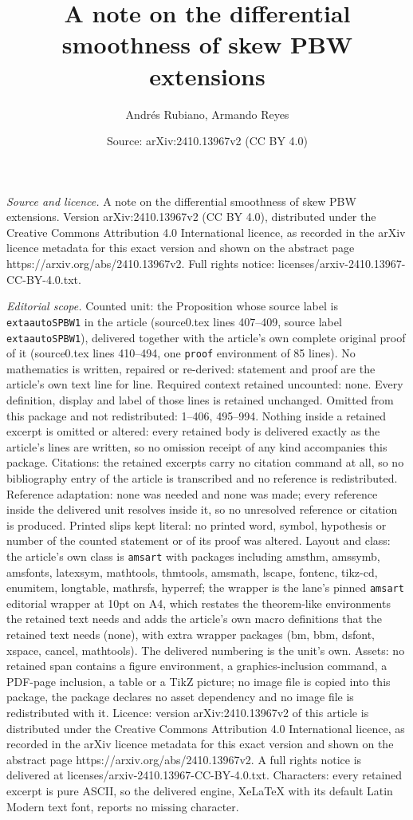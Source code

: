 \documentclass[10pt,a4paper]{amsart}
\title[A note on the differential smoothness of skew PBW extensions]{A note on the differential smoothness of skew PBW extensions}
\author{Andr\'es Rubiano, Armando Reyes}
\date{Source: arXiv:2410.13967v2 (CC BY 4.0)}
\begin{document}
\maketitle

\noindent\emph{Source and licence.} A note on the differential smoothness of skew PBW extensions. Version arXiv:2410.13967v2 (CC BY 4.0), distributed under the Creative Commons Attribution 4.0 International licence, as recorded in the arXiv licence metadata for this exact version and shown on the abstract page https://arxiv.org/abs/2410.13967v2. Full rights notice: licenses/arxiv-2410.13967-CC-BY-4.0.txt.\par\smallskip

\noindent\textit{Editorial scope.} Counted unit: the Proposition whose source label is \texttt{extaautoSPBW1} in the article (source0.tex lines 407--409, source label \texttt{extaautoSPBW1}), delivered together with the article's own complete original proof of it (source0.tex lines 410--494, one \texttt{proof} environment of 85 lines). No mathematics is written, repaired or re-derived: statement and proof are the article's own text line for line. Required context retained uncounted: none. Every definition, display and label of those lines is retained unchanged. Omitted from this package and not redistributed: 1--406, 495--994. Nothing inside a retained excerpt is omitted or altered: every retained body is delivered exactly as the article's lines are written, so no omission receipt of any kind accompanies this package. Citations: the retained excerpts carry no citation command at all, so no bibliography entry of the article is transcribed and no reference is redistributed. Reference adaptation: none was needed and none was made; every reference inside the delivered unit resolves inside it, so no unresolved reference or citation is produced. Printed slips kept literal: no printed word, symbol, hypothesis or number of the counted statement or of its proof was altered. Layout and class: the article's own class is \texttt{amsart} with packages including amsthm, amssymb, amsfonts, latexsym, mathtools, thmtools, amsmath, lscape, fontenc, tikz-cd, enumitem, longtable, mathrsfs, hyperref; the wrapper is the lane's pinned \texttt{amsart} editorial wrapper at 10pt on A4, which restates the theorem-like environments the retained text needs and adds the article's own macro definitions that the retained text needs (none), with extra wrapper packages (bm, bbm, dsfont, xspace, cancel, mathtools). The delivered numbering is the unit's own. Assets: no retained span contains a figure environment, a graphics-inclusion command, a PDF-page inclusion, a table or a TikZ picture; no image file is copied into this package, the package declares no asset dependency and no image file is redistributed with it. Licence: version arXiv:2410.13967v2 of this article is distributed under the Creative Commons Attribution 4.0 International licence, as recorded in the arXiv licence metadata for this exact version and shown on the abstract page https://arxiv.org/abs/2410.13967v2. A full rights notice is delivered at licenses/arxiv-2410.13967-CC-BY-4.0.txt. Characters: every retained excerpt is pure ASCII, so the delivered engine, XeLaTeX with its default Latin Modern text font, reports no missing character.
\end{document}
